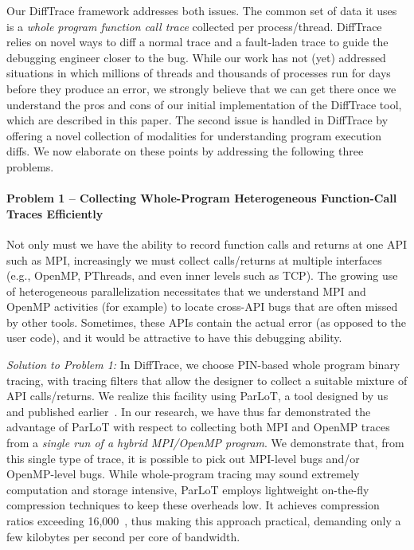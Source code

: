 Our DiffTrace framework addresses both issues.
%
The common set of data it uses is a {\em whole program
function call trace} collected per process/thread.
%
DiffTrace relies on
novel ways to diff a normal trace and a fault-laden trace to guide the
debugging engineer closer to the bug.
%
While our work has not (yet) addressed situations in
which millions of threads and thousands of processes run
for days before they produce an error,
we strongly believe that we can get there
once we understand the pros and cons of our initial
implementation of the DiffTrace tool, which are described in this paper.
%
The second issue is handled in DiffTrace by offering a novel
collection of modalities for understanding program execution diffs.
%
We now elaborate on these points by addressing the following three problems.



\paragraph{Problem 1 -- Collecting Whole-Program Heterogeneous Function-Call Traces
Efficiently\/} Not only must we have the ability
to record function calls and returns at one
API such as MPI, increasingly we must collect calls/returns at multiple
interfaces (e.g., OpenMP, PThreads, and even inner levels such as TCP).
%
The growing use of heterogeneous parallelization necessitates that we 
understand MPI and OpenMP activities (for example) to locate cross-API
bugs that are often missed by other tools.
%
Sometimes, these APIs contain the actual error (as opposed to the user code), and it would be attractive to have this debugging ability.


{\em Solution to Problem 1:\/}
In DiffTrace, we choose PIN-based whole program binary tracing, with
tracing filters that allow the designer to collect a suitable mixture of API
calls/returns.
%
We realize this facility using
ParLoT, a tool designed by us and published earlier~\cite{parlot-paper}.
%
In our research, we have thus far demonstrated the advantage of
ParLoT with respect to collecting both MPI and OpenMP traces
from a {\em single run of a hybrid MPI/OpenMP program}.
%
We demonstrate that, from this single type of trace, it is possible
to pick out MPI-level bugs and/or OpenMP-level bugs.
%
While whole-program tracing
may sound extremely computation and storage intensive, ParLoT employs
lightweight on-the-fly compression techniques to keep these overheads low.
%
It achieves compression ratios exceeding 16,000~\cite{parlot-paper},
thus making this approach practical, demanding
only a few kilobytes per second per core of bandwidth.


